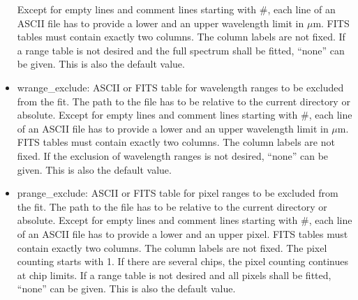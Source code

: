 \begin{itemize}
Except for empty lines and comment lines starting with \#, each line of an
ASCII file has to provide a lower and an upper wavelength limit in $\mu$m. FITS
tables must contain exactly two columns. The column labels are not fixed. If a
range table is not desired and the full spectrum shall be fitted, ``none'' can
be given. This is also the default value.
\item {\sc wrange\_exclude}: ASCII or FITS table for wavelength ranges to be
excluded from the fit. The path to the file has to be relative to the current directory
or absolute. Except for empty lines and comment lines starting with \#, each
line of an ASCII file has to provide a lower and an upper wavelength limit in
$\mu$m. FITS tables must contain exactly two columns. The column labels are not
fixed. If the exclusion of wavelength ranges is not desired, ``none'' can be
given. This is also the default value.
\item {\sc prange\_exclude}: ASCII or FITS table for pixel ranges to be
excluded from the fit. The path to the file has to be relative to the current directory
or absolute. Except for empty lines and comment lines starting with \#, each
line of an ASCII file has to provide a lower and an upper pixel. FITS tables
must contain exactly two columns. The column labels are not fixed. The pixel
counting starts with 1. If there are several chips, the pixel counting
continues at chip limits. If a range table is not desired and all pixels shall
be fitted, ``none'' can be given. This is also the default value.
\end{itemize}

